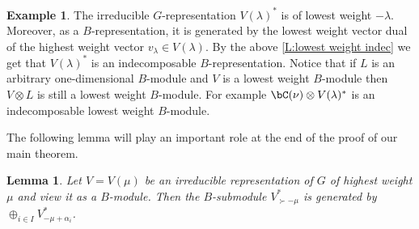 \documentclass[reqno, 10pt]{amsart}
\theoremstyle{plain}
\newtheorem{lemma}[proposition]{Lemma}
\theoremstyle{definition}
\newtheorem{example}[proposition]{Example}
\numberwithin{equation}{section}%
\begin{document}
\begin{example}
	The irreducible $G$-representation $V(\lambda)^*$ is of lowest weight $-\lambda$.
	Moreover, as a $B$-representation, it is generated by the lowest weight vector dual of the highest weight vector $v_\lambda\in V(\lambda)$.
	By the above \cref{L:lowest weight indec} we get that $V(\lambda)^*$ is an indecomposable $B$-representation.
	Notice that if $L$ is an arbitrary one-dimensional $B$-module
        and $V$ is a lowest weight $B$-module then $V\otimes L$ is
        still a lowest weight $B$-module. 
	For example $\bC(\nu)\otimes V(\lambda)^*$ is an
        indecomposable lowest weight 
        $B$-module.
\end{example}

The following lemma will play an important role at the end of the proof of our main theorem.
\begin{lemma}\label{L:submodule bigger than -mu}
	Let $V=V(\mu)$ be an irreducible representation of $G$ of highest weight $\mu$ and view it as a $B$-module.
	Then the $B$-submodule $V^*_{\succ-\mu}$ is generated by $\oplus_{i\in I} V^*_{-\mu+\alpha_i}$.
\end{lemma}
\end{document}
